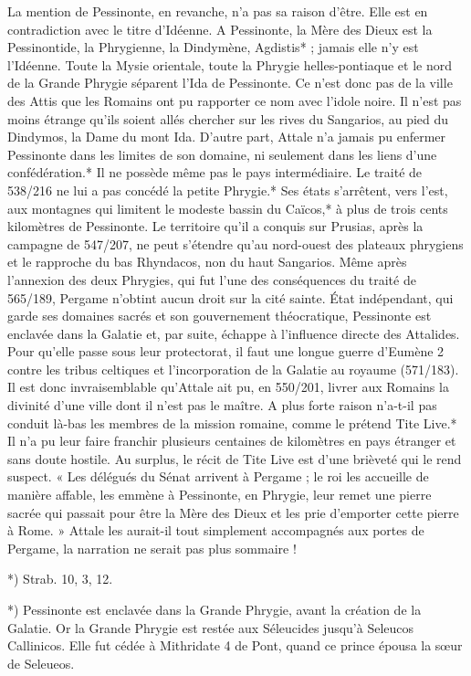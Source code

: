 \documentclass[a4paper, 11pt, oneside, polutonikogreek, french]{article}
\begin{document}
La mention de Pessinonte, en revanche, n'a pas sa raison d'être. Elle est en contradiction avec le titre d'Idéenne. A Pessinonte, la Mère des Dieux est la Pessinontide, la Phrygienne, la Dindymène, Agdistis* ; jamais elle n'y est l'Idéenne. Toute la Mysie orientale, toute la Phrygie helles-pontiaque et le nord de la Grande Phrygie séparent l'Ida de Pessinonte. Ce n'est donc pas de la ville des Attis que les Romains ont pu rapporter ce nom avec l'idole noire. Il n'est pas moins étrange qu'ils soient allés chercher sur les rives du Sangarios, au pied du Dindymos, la Dame du mont Ida. D'autre part, Attale n'a jamais pu enfermer Pessinonte dans les limites de son domaine, ni seulement dans les liens d'une confédération.* Il ne possède même pas le pays intermédiaire. Le traité de 538/216 ne lui a pas concédé la petite Phrygie.* Ses états s'arrêtent, vers l'est, aux montagnes qui limitent le modeste bassin du Caïcos,* à plus de trois cents kilomètres de Pessinonte. Le territoire qu'il a conquis sur Prusias, après la campagne de 547/207, ne peut s'étendre qu'au nord-ouest des plateaux phrygiens et le rapproche du bas Rhyndacos, non du haut Sangarios. Même après l'annexion des deux Phrygies, qui fut l'une des conséquences du traité de 565/189, Pergame n'obtint aucun droit sur la cité sainte. État indépendant, qui garde ses domaines sacrés et son gouvernement théocratique, Pessinonte est enclavée dans la Galatie et, par suite, échappe à l'influence directe des Attalides. Pour qu'elle passe sous leur protectorat, il faut une longue guerre d'Eumène 2 contre les tribus celtiques et l'incorporation de la Galatie au royaume (571/183). Il est donc invraisemblable qu'Attale ait pu, en 550/201, livrer aux Romains la divinité d'une ville dont il n'est pas le maître. A plus forte raison n'a-t-il pas conduit là-bas les membres de la mission romaine, comme le prétend Tite Live.* Il n'a pu leur faire franchir plusieurs centaines de kilomètres en pays étranger et sans doute hostile. Au surplus, le récit de Tite Live est d'une brièveté qui le rend suspect. « Les délégués du Sénat arrivent à Pergame ; le roi les accueille de manière affable, les emmène à Pessinonte, en Phrygie, leur remet une pierre sacrée qui passait pour être la Mère des Dieux et les prie d'emporter cette pierre à Rome. » Attale les aurait-il tout simplement accompagnés aux portes de Pergame, la narration ne serait pas plus sommaire !

*) Strab. 10, 3, 12.

*) Pessinonte est enclavée dans la Grande Phrygie, avant la création de la Galatie. Or la Grande Phrygie est restée aux Séleucides jusqu'à Seleucos Callinicos. Elle fut cédée à Mithridate 4 de Pont, quand ce prince épousa la sœur de Seleueos.
\end{document}
